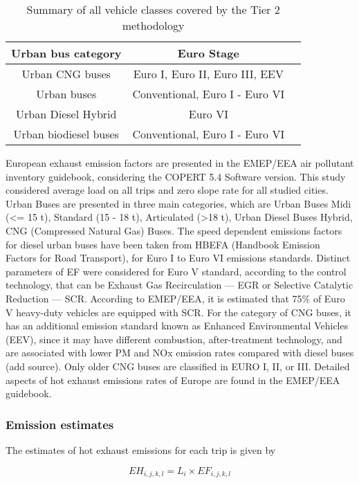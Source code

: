 \documentclass[gc, manuscript]{copernicus}
\begin{document}
\begin{table*}[t]
\caption{Summary of all vehicle classes covered by the Tier 2 methodology}
\begin{tabular}{ccc}
\hline
Urban bus category  & Euro Stage  \\ \hline
Urban CNG buses & Euro I, Euro II, Euro III, EEV   \\
Urban buses   &  Conventional, Euro I - Euro VI\\
Urban Diesel Hybrid  & Euro VI  \\
Urban biodiesel buses   & Conventional, Euro I - Euro VI\\
\hline
\end{tabular}
\end{table*}

European exhaust emission factors are presented in the EMEP/EEA air
pollutant inventory guidebook, considering the COPERT 5.4 Software
version. This study considered average load on all trips and zero slope
rate for all studied cities. Urban Buses are presented in three main
categories, which are Urban Buses Midi (\textless= 15 t), Standard (15 -
18 t), Articulated (\textgreater18 t), Urban Diesel Buses Hybrid, CNG
(Compressed Natural Gas) Buses. The speed dependent emissions factors
for diesel urban buses have been taken from HBEFA (Handbook Emission
Factors for Road Transport), for Euro I to Euro VI emissions standards.
Distinct parameters of EF were considered for Euro V standard, according
to the control technology, that can be Exhaust Gas Recirculation --- EGR
or Selective Catalytic Reduction --- SCR. According to EMEP/EEA, it is
estimated that 75\% of Euro V heavy-duty vehicles are equipped with SCR.
For the category of CNG buses, it has an additional emission standard
known as Enhanced Environmental Vehicles (EEV), since it may have
different combustion, after-treatment technology, and are associated
with lower PM and NOx emission rates compared with diesel buses (add
source). Only older CNG buses are classified in EURO I, II, or III.
Detailed aspects of hot exhaust emissions rates of Europe are found in
the EMEP/EEA guidebook.

\subsubsection{Emission estimates}

The estimates of hot exhaust emissions for each trip is given by

\begin{equation}
EH_{i,j,k,l} = L_i\times EF_{i,j,k,l}
\end{equation}
\end{document}
